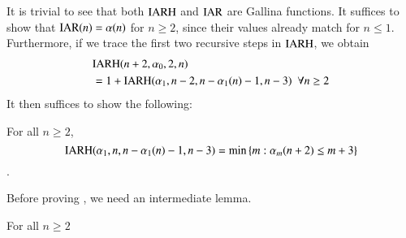 It is trivial to see that both $\text{IARH}$ and $\text{IAR}$ are 
Gallina functions. It suffices to show that 
$\text{IAR}(n) = \alpha(n)$ for $n\ge 2$, since their values 
already match for $n\le 1$. Furthermore, if we trace 
the first two recursive steps in $\text{IARH}$, we obtain
\begin{equation*}
\begin{aligned}
& \text{IARH}(n+2, \alpha_0, 2, n) \\
& = 1 + \text{IARH}(\alpha_1, n-2, n-\alpha_1(n)-1, n-3) \ \ \forall n\ge 2
\end{aligned}
\end{equation*}
It then suffices to show the following:

\begin{lem}  \label{lem: inv_ack_rec_helper}
For all $n\ge 2$,
$$\text{IARH}(\alpha_1, n, n - \alpha_1(n) - 1, n - 3) = \min\left\{m : \alpha_m(n+2)\le m+3 \right\}$$.
\end{lem}

Before proving , we need an intermediate lemma.

\begin{lem}
For all $n\ge 2$
\end{lem}